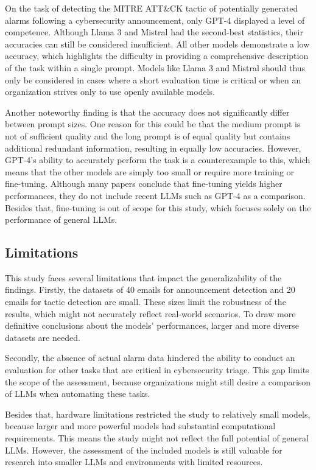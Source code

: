 On the task of detecting the MITRE ATT\&CK tactic of potentially generated alarms following a cybersecurity
announcement, only GPT-4 displayed a level of competence.
Although Llama 3 and Mistral had the second-best statistics, their accuracies can still be considered insufficient.
All other models demonstrate a low accuracy, which highlights the difficulty in providing a comprehensive description
of the task within a single prompt.
Models like Llama 3 and Mistral should thus only be considered in cases where a short evaluation time is critical or
when an organization strives only to use openly available models.

Another noteworthy finding is that the accuracy does not significantly differ between prompt sizes.
One reason for this could be that the medium prompt is not of sufficient quality and the long prompt is of equal quality
but contains additional redundant information, resulting in equally low accuracies.
However, GPT-4's ability to accurately perform the task is a counterexample to this, which means that the other models
are simply too small or require more training or fine-tuning.
Although many papers conclude that fine-tuning yields higher performances, they do not include recent LLMs such as
GPT-4 as a comparison.
Besides that, fine-tuning is out of scope for this study, which focuses solely on the performance of general LLMs.

\subsection{Limitations}
\label{subsec:limitations}

This study faces several limitations that impact the generalizability of the findings.
Firstly, the datasets of 40 emails for announcement detection and 20 emails for tactic detection are small.
These sizes limit the robustness of the results, which might not accurately reflect real-world scenarios.
To draw more definitive conclusions about the models' performances, larger and more diverse datasets are needed.

Secondly, the absence of actual alarm data hindered the ability to conduct an evaluation for other tasks that are
critical in cybersecurity triage.
This gap limits the scope of the assessment, because organizations might still desire a comparison of LLMs when
automating these tasks.

Besides that, hardware limitations restricted the study to relatively small models, because larger and more powerful
models had substantial computational requirements.
This means the study might not reflect the full potential of general LLMs.
However, the assessment of the included models is still valuable for research into smaller LLMs and environments with
limited resources.

